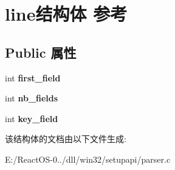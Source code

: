 \hypertarget{structline}{}\section{line结构体 参考}
\label{structline}
\subsection*{Public 属性}
\begin{DoxyCompactItemize}
\item 
\mbox{\label{structline_a40cfe320e60b655263bbddf0c7cb863d}} 
int {\bfseries first\+\_\+field}
\item 
\mbox{\label{structline_a5aa3e874ed3cef474af6d735f90f673a}} 
int {\bfseries nb\+\_\+fields}
\item 
\mbox{\label{structline_a5cf56a6b406295aebab5ab3f6dcd2c57}} 
int {\bfseries key\+\_\+field}
\end{DoxyCompactItemize}


该结构体的文档由以下文件生成\+:\begin{DoxyCompactItemize}
\item 
E\+:/\+React\+O\+S-\/0../dll/win32/setupapi/parser.\+c\end{DoxyCompactItemize}
